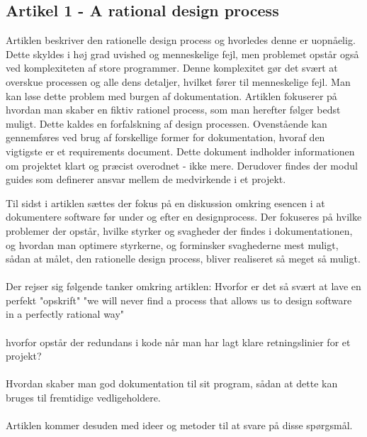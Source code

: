 \documentclass[a4paper,12pt]{article}
\begin{document}
\subsection{Artikel 1 - A rational design process}
Artiklen beskriver den rationelle design process og hvorledes denne er uopnåelig. Dette skyldes i høj grad uvished og menneskelige fejl, men problemet opstår også ved komplexiteten af store programmer. Denne komplexitet gør det svært at overskue processen og alle dens detaljer, hvilket fører til menneskelige fejl. Man kan løse dette problem med burgen af dokumentation.
Artiklen fokuserer på hvordan man skaber en fiktiv rationel process, som man herefter følger bedst muligt.
Dette kaldes en forfalskning af design processen.
Ovenstående kan gennemføres ved brug af forskellige former for dokumentation, hvoraf den vigtigste er et
requirements document. Dette dokument indholder informationen om projektet klart og præcist overodnet - ikke mere.
Derudover findes der modul guides som definerer ansvar mellem de medvirkende i et projekt.

Til sidst i artiklen sættes der fokus på en diskussion omkring esencen i at dokumentere software før under og efter en designprocess. Der fokuseres på hvilke problemer der opstår, hvilke styrker og svagheder der findes i dokumentationen, og hvordan man optimere styrkerne, og forminsker svaghederne mest muligt, sådan at målet, den rationelle design process, bliver realiseret så meget så muligt.
\\
\\
Der rejser sig følgende tanker omkring artiklen:
Hvorfor er det så svært at lave en perfekt "opskrift"
"we will never find a process that allows us to design software in a perfectly rational way"
\\
\\
hvorfor opstår der redundans i kode når man har lagt klare retningslinier for et projekt?
\\
\\
Hvordan skaber man god dokumentation til sit program, sådan at dette kan bruges til fremtidige vedligeholdere.
\\
\\
Artiklen kommer desuden med ideer og metoder til at svare på disse spørgsmål.
\end{document}
